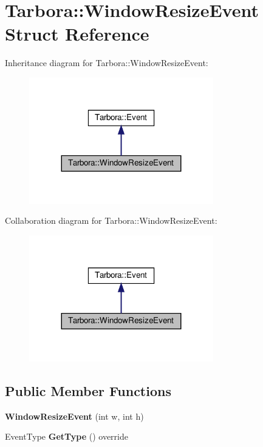 \hypertarget{structTarbora_1_1WindowResizeEvent}{}\section{Tarbora\+:\+:Window\+Resize\+Event Struct Reference}
\label{structTarbora_1_1WindowResizeEvent}


Inheritance diagram for Tarbora\+:\+:Window\+Resize\+Event\+:\nopagebreak
\begin{figure}[H]
\begin{center}
\leavevmode
\includegraphics[width=227pt]{structTarbora_1_1WindowResizeEvent__inherit__graph}
\end{center}
\end{figure}


Collaboration diagram for Tarbora\+:\+:Window\+Resize\+Event\+:\nopagebreak
\begin{figure}[H]
\begin{center}
\leavevmode
\includegraphics[width=227pt]{structTarbora_1_1WindowResizeEvent__coll__graph}
\end{center}
\end{figure}
\subsection*{Public Member Functions}
\begin{DoxyCompactItemize}
\item 
\mbox{\label{structTarbora_1_1WindowResizeEvent_a71707fd83a44c8bcfefbb1e3fd8a114d}} 
{\bfseries Window\+Resize\+Event} (int w, int h)
\item 
\mbox{\label{structTarbora_1_1WindowResizeEvent_ac6e4e8e633bf12a746b5668744f3f8b8}} 
Event\+Type {\bfseries Get\+Type} () override
\end{DoxyCompactItemize}
